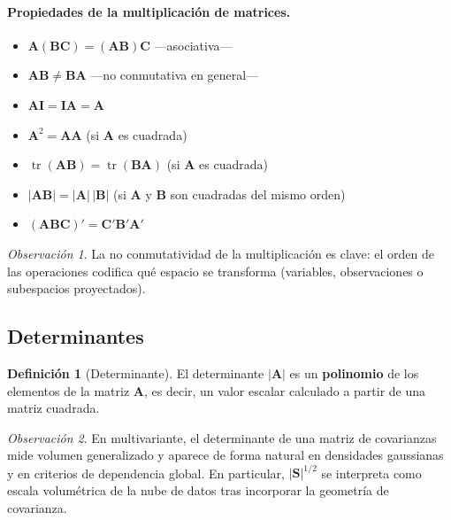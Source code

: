 \documentclass[12pt, a4paper]{article}
\theoremstyle{plain}
\theoremstyle{definition}
\newtheorem{definicion}[teorema]{Definición}
\theoremstyle{remark}
\newtheorem*{observacion}{Observación}
\newcommand{\mat}[1]{\mathbf{#1}}
\newcommand{\tr}{\operatorname{tr}}
\begin{document}
\paragraph{Propiedades de la multiplicación de matrices.}

\begin{itemize}
  \item $\mat{A}(\mat{B}\mat{C}) = (\mat{A}\mat{B})\mat{C}$ \quad —asociativa—
  \item $\mat{A}\mat{B} \neq \mat{B}\mat{A}$ \quad —no conmutativa en general—
  \item $\mat{A}\mat{I} = \mat{I}\mat{A} = \mat{A}$
  \item $\mat{A}^2 = \mat{A}\mat{A}$ \quad (si $\mat{A}$ es cuadrada)
  \item $\tr(\mat{A}\mat{B}) = \tr(\mat{B}\mat{A})$ \quad (si $\mat{A}$ es cuadrada)
  \item $|\mat{A}\mat{B}| = |\mat{A}|\,|\mat{B}|$ \quad (si $\mat{A}$ y $\mat{B}$ son cuadradas del mismo orden)
  \item $(\mat{A}\mat{B}\mat{C})' = \mat{C}'\mat{B}'\mat{A}'$
\end{itemize}

\begin{observacion}
La no conmutatividad de la multiplicación es clave: el orden de las operaciones
codifica qué espacio se transforma (variables, observaciones o subespacios
proyectados).
\end{observacion}

\subsection{Determinantes}

\begin{definicion}[Determinante]
El determinante $|\mat{A}|$ es un \textbf{polinomio} de los elementos de la
matriz $\mat{A}$, es decir, un valor escalar calculado a partir de una matriz
cuadrada.
\end{definicion}

\begin{observacion}
En multivariante, el determinante de una matriz de covarianzas mide volumen
generalizado y aparece de forma natural en densidades gaussianas y en criterios
de dependencia global. En particular, $|\mat{S}|^{1/2}$ se interpreta como
escala volumétrica de la nube de datos tras incorporar la geometría de
covarianza.
\end{observacion}
\end{document}
